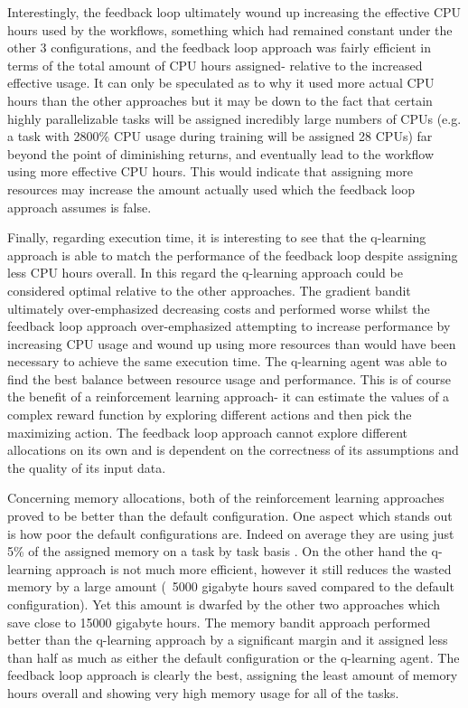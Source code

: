 Interestingly, the feedback loop ultimately wound up increasing the effective CPU hours used by the workflows, something which had remained constant under the other 3 configurations, and the feedback loop approach was fairly efficient in terms of the total amount of CPU hours assigned- relative to the increased effective usage. It can only be speculated as to why it used more actual CPU hours than the other approaches but it may be down to the fact that certain highly parallelizable tasks will be assigned incredibly large numbers of CPUs (e.g. a task with 2800\% CPU usage during training will be assigned 28 CPUs) far beyond the point of diminishing returns, and eventually lead to the workflow using more effective CPU hours. This would indicate that assigning more resources may increase the amount actually used which the feedback loop approach assumes is false.

Finally, regarding execution time, it is interesting to see that the q-learning approach is able to match the performance of the feedback loop despite assigning less CPU hours overall. In this regard the q-learning approach could be considered optimal relative to the other approaches. The gradient bandit ultimately over-emphasized decreasing costs and performed worse whilst the feedback loop approach over-emphasized attempting to increase performance by increasing CPU usage and wound up using more resources than would have been necessary to achieve the same execution time. The q-learning agent was able to find the best balance between resource usage and performance. This is of course the benefit of a reinforcement learning approach- it can estimate the values of a complex reward function by exploring different actions and then pick the maximizing action. The feedback loop approach cannot explore different allocations on its own and is dependent on the correctness of its assumptions and the quality of its input data.

Concerning memory allocations, both of the reinforcement learning approaches proved to be better than the default configuration. One aspect which stands out is how poor the default configurations are. Indeed on average they are using just 5\% of the assigned memory on a task by task basis . On the other hand the q-learning approach is not much more efficient, however it still reduces the wasted memory by a large amount (~5000 gigabyte hours saved compared to the default configuration). Yet this amount is dwarfed by the other two approaches which save close to 15000 gigabyte hours. The memory bandit approach performed better than the q-learning approach by a significant margin and it assigned less than half as much as either the default configuration or the q-learning agent. The feedback loop approach is clearly the best, assigning the least amount of memory hours overall and showing very high memory usage for all of the tasks.

